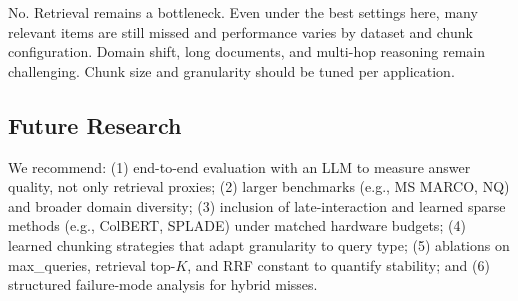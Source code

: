 \documentclass[twoside,11pt]{article}
\begin{document}
No. Retrieval remains a bottleneck. Even under the best settings here, many relevant items are still missed and performance varies by dataset and chunk configuration. Domain shift, long documents, and multi-hop reasoning remain challenging. Chunk size and granularity should be tuned per application.

\subsection{Future Research}

We recommend: (1) end-to-end evaluation with an LLM to measure answer quality, not only retrieval proxies; (2) larger benchmarks (e.g., MS MARCO, NQ) and broader domain diversity; (3) inclusion of late-interaction and learned sparse methods (e.g., ColBERT, SPLADE) under matched hardware budgets; (4) learned chunking strategies that adapt granularity to query type; (5) ablations on max\_queries, retrieval top-$K$, and RRF constant to quantify stability; and (6) structured failure-mode analysis for hybrid misses.



\end{document}
